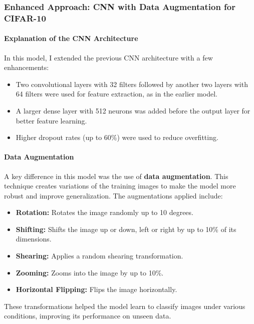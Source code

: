 \documentclass[lettersize,journal]{IEEEtran}
\begin{document}
\subsubsection{\textbf{Enhanced Approach: CNN with Data Augmentation for CIFAR-10}}

\paragraph{\textbf{Explanation of the CNN Architecture}}

In this model, I extended the previous CNN architecture with a few enhancements:
\begin{itemize}
    \item Two convolutional layers with 32 filters followed by another two layers with 64 filters were used for feature extraction, as in the earlier model.
    \item A larger dense layer with 512 neurons was added before the output layer for better feature learning.
    \item Higher dropout rates (up to 60\%) were used to reduce overfitting.
\end{itemize}

\paragraph{\textbf{Data Augmentation}}

A key difference in this model was the use of \textbf{data augmentation}. This technique creates variations of the training images to make the model more robust and improve generalization. The augmentations applied include:
\begin{itemize}
    \item \textbf{Rotation:} Rotates the image randomly up to 10 degrees.
    \item \textbf{Shifting:} Shifts the image up or down, left or right by up to 10\% of its dimensions.
    \item \textbf{Shearing:} Applies a random shearing transformation.
    \item \textbf{Zooming:} Zooms into the image by up to 10\%.
    \item \textbf{Horizontal Flipping:} Flips the image horizontally.
\end{itemize}

These transformations helped the model learn to classify images under various conditions, improving its performance on unseen data.
\end{document}
